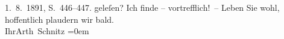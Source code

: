 \begin{ledgroupsized}[t]{13cm}
{{{                        1. 8. 1891, S. 446–447.}}}\label{K_L00028_3h} geleſen? Ich finde –
               vortrefflich! –\pend
           \pstart
           Leben Sie wohl, hoffentlich plaudern wir bald.{\\[\baselineskip]}Ihr\spacefill\mbox{Arth
                  Schnitz}\pend
           \leftskip=0em{}          \endnumbering{}\end{ledgroupsized}  \newcommand{\dateiname}{L00028}\newcommand{\titel}{Arthur Schnitzler an Hugo von Hofmannsthal, 11. 8. 1891}\newcommand{\editorInnen}{ Martin Anton Müller und Gerd-Hermann Susen}
            \footnotesize
\begin{ledgroupsized}[t]{11.5cm}
\end{ledgroupsized}
         
      